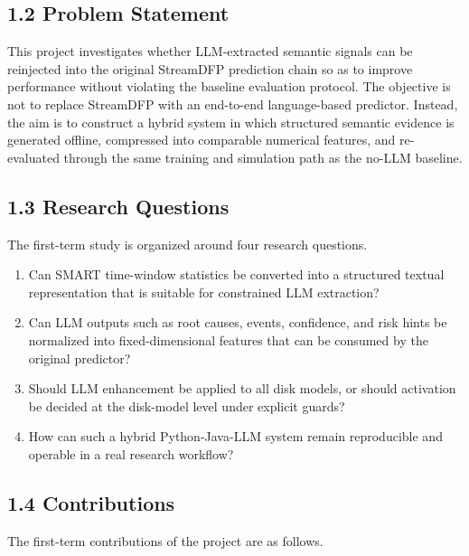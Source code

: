 \documentclass[
  11pt,
  a4paper]{article}
\providecommand{\tightlist}{%
  \setlength{\itemsep}{0pt}\setlength{\parskip}{0pt}}
\begin{document}
\hypertarget{problem-statement}{%
\subsection{1.2 Problem Statement}\label{problem-statement}}

This project investigates whether LLM-extracted semantic signals can be
reinjected into the original StreamDFP prediction chain so as to improve
performance without violating the baseline evaluation protocol. The
objective is not to replace StreamDFP with an end-to-end language-based
predictor. Instead, the aim is to construct a hybrid system in which
structured semantic evidence is generated offline, compressed into
comparable numerical features, and re-evaluated through the same
training and simulation path as the no-LLM baseline.

\hypertarget{research-questions}{%
\subsection{1.3 Research Questions}\label{research-questions}}

The first-term study is organized around four research questions.

\begin{enumerate}
\def\labelenumi{\arabic{enumi}.}
\tightlist
\item
  Can SMART time-window statistics be converted into a structured
  textual representation that is suitable for constrained LLM
  extraction?
\item
  Can LLM outputs such as root causes, events, confidence, and risk
  hints be normalized into fixed-dimensional features that can be
  consumed by the original predictor?
\item
  Should LLM enhancement be applied to all disk models, or should
  activation be decided at the disk-model level under explicit guards?
\item
  How can such a hybrid Python-Java-LLM system remain reproducible and
  operable in a real research workflow?
\end{enumerate}

\hypertarget{contributions}{%
\subsection{1.4 Contributions}\label{contributions}}

The first-term contributions of the project are as follows.
\end{document}
